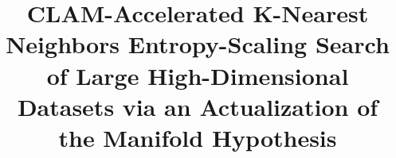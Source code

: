 \documentclass{article}
\makeatletter
\newcommand{\linebreakand}{%
  \end{@IEEEauthorhalign}
  \hfill\mbox{}\par
  \mbox{}\hfill\begin{@IEEEauthorhalign}
}
\makeatother
\begin{document}
\title{CLAM-Accelerated K-Nearest Neighbors Entropy-Scaling Search of Large High-Dimensional Datasets via an Actualization of the Manifold Hypothesis}





\end{document}

